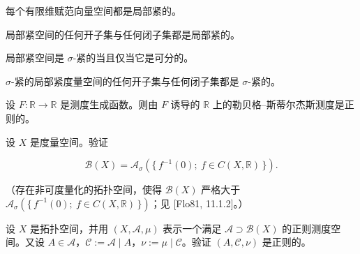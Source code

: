 \begin{exercises}
\begin{items}
每个有限维赋范向量空间都是局部紧的。

\item

局部紧空间的任何开子集与任何闭子集都是局部紧的。

\item

局部紧空间是 $ \sigma $-紧的当且仅当它是可分的。

\item

$ \sigma $-紧的局部紧度量空间的任何开子集与任何闭子集都是 $ \sigma $-紧的。

\end{items}

\item

设 $ F : \mathbb{R} \to \mathbb{R} $ 是测度生成函数。则由 $ F $ 诱导的 $ \mathbb{R} $ 上的勒贝格–斯蒂尔杰斯测度是正则的。

\item

设 $ X $ 是度量空间。验证

\[
\mathcal{B}(X) = \mathcal{A}_\sigma\left(\{\, f^{-1}(0) ;\ f \in C(X,\mathbb{R}) \,\}\right) .
\]

（存在非可度量化的拓扑空间，使得 $ \mathcal{B}(X) $ 严格大于 $ \mathcal{A}_\sigma(\{\, f^{-1}(0) ;\ f \in C(X,\mathbb{R}) \,\}) $；见 [Flo81, 11.1.2]。）

\item

设 $ X $ 是拓扑空间，并用 $ (X,\mathcal{A},\mu) $ 表示一个满足 $ \mathcal{A} \supset \mathcal{B}(X) $ 的正则测度空间。又设 $ A \in \mathcal{A} $，$ \mathcal{C} := \mathcal{A} \mid A $，$ \nu := \mu \mid \mathcal{C} $。验证 $ (A,\mathcal{C},\nu) $ 是正则的。

\end{exercises}
